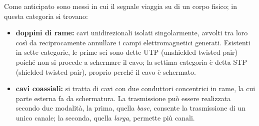 \documentclass{subfiles}
\begin{document}
Come anticipato sono messi in cui il segnale viaggia su di un corpo fisico; in questa categoria si trovano:
\begin{itemize}
    \item \textbf{doppini di rame:} cavi unidirezionali isolati singolarmente,
          avvolti tra loro così da reciprocamente annullare i campi elettromagnetici generati.
          Esistenti in sette categorie, le prime sei sono dette UTP (unshielded twisted pair) poiché non si procede a schermare il cavo;
          la settima categoria è detta STP (shielded twisted pair), proprio perché il cavo è schermato.

    \item \textbf{cavi coassiali:} si tratta di cavi con due conduttori concentrici in rame, la cui parte esterna fa da schermatura.
          La trasmissione può essere realizzata secondo due modalità, la prima, quella \emph{base}, consente la trasmissione di un unico canale;
          la seconda, quella \emph{larga}, permette più canali.
\end{itemize}
\end{document}

